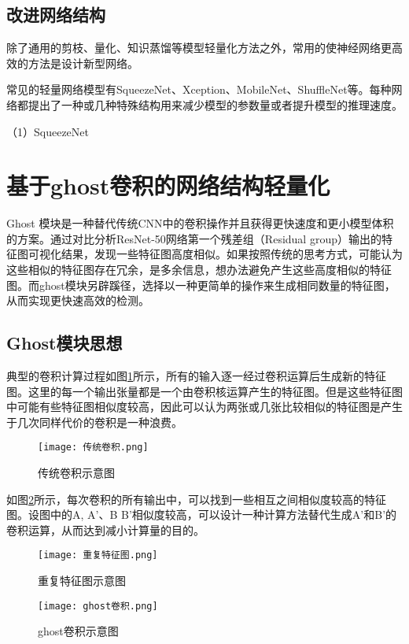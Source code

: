 \subsection{改进网络结构}
除了通用的剪枝、量化、知识蒸馏等模型轻量化方法之外，常用的使神经网络更高效的方法是设计新型网络。

常见的轻量网络模型有SqueezeNet、Xception、MobileNet、ShuffleNet等。每种网络都提出了一种或几种特殊结构用来减少模型的参数量或者提升模型的推理速度。

（1）SqueezeNet




\section{基于ghost卷积的网络结构轻量化}
Ghost 模块是一种替代传统CNN中的卷积操作并且获得更快速度和更小模型体积的方案。通过对比分析ResNet-50网络第一个残差组（Residual group）输出的特征图可视化结果，发现一些特征图高度相似。如果按照传统的思考方式，可能认为这些相似的特征图存在冗余，是多余信息，想办法避免产生这些高度相似的特征图。而ghost模块另辟蹊径，选择以一种更简单的操作来生成相同数量的特征图，从而实现更快速高效的检测。

\subsection{Ghost模块思想}
典型的卷积计算过程如图\ref{conv}所示，所有的输入逐一经过卷积运算后生成新的特征图。这里的每一个输出张量都是一个由卷积核运算产生的特征图。但是这些特征图中可能有些特征图相似度较高，因此可以认为两张或几张比较相似的特征图是产生于几次同样代价的卷积是一种浪费。

\begin{figure}[htbp]
    \centering
    \texttt{[image: 传统卷积.png]}
    \caption{传统卷积示意图}
    \label{conv}
\end{figure}

如图\ref{identical}所示，每次卷积的所有输出中，可以找到一些相互之间相似度较高的特征图。设图中的A, A’、B B’相似度较高，可以设计一种计算方法替代生成A’和B’的卷积运算，从而达到减小计算量的目的。

\begin{figure}[htbp]
    \centering
    \texttt{[image: 重复特征图.png]}
    \caption{重复特征图示意图}
    \label{identical}
\end{figure}

\begin{figure}[htbp]
    \centering
    \texttt{[image: ghost卷积.png]}
    \caption{ghost卷积示意图}
    \label{ghost1}
\end{figure}

